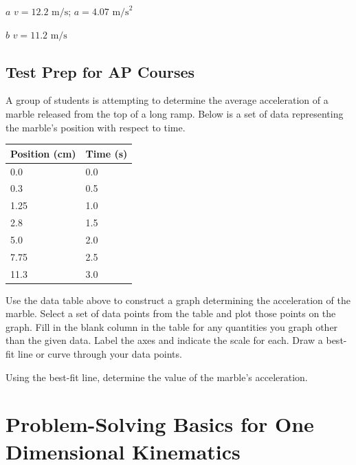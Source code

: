 \documentclass[
]{book}
\begin{document}
\leavevmode{}%
\(a\) \({{v = \text{12}}\text{.}\text{2\ m/s}}{}\);
\({{a = 4}\text{.}\text{07\ m/s}^{2}}{}\)

\(b\) \({{v = \text{11}}\text{.}\text{2\ m/s}}{}\)

\hypertarget{fs-id2388866}{}
\hypertarget{test-prep-for-ap-courses-4}{%
\subsection{Test Prep for AP Courses}\label{test-prep-for-ap-courses-4}}

\hypertarget{fs-id1844508}{}
\leavevmode{}%
A group of students is attempting to determine the average acceleration
of a marble released from the top of a long ramp. Below is a set of data
representing the marble's position with respect to time.

\begin{longtable}[]{@{}ll@{}}
\toprule
Position (cm) & Time (s) \\
\midrule
\endhead
0.0 & 0.0 \\
0.3 & 0.5 \\
1.25 & 1.0 \\
2.8 & 1.5 \\
5.0 & 2.0 \\
7.75 & 2.5 \\
11.3 & 3.0 \\
\bottomrule
\end{longtable}

Use the data table above to construct a graph determining the
acceleration of the marble. Select a set of data points from the table
and plot those points on the graph. Fill in the blank column in the
table for any quantities you graph other than the given data. Label the
axes and indicate the scale for each. Draw a best-fit line or curve
through your data points.

Using the best-fit line, determine the value of the marble's
acceleration.

\hypertarget{problem-solving-basics-for-one-dimensional-kinematics}{%
\section{Problem-Solving Basics for One Dimensional Kinematics}\label{problem-solving-basics-for-one-dimensional-kinematics}}
\end{document}
